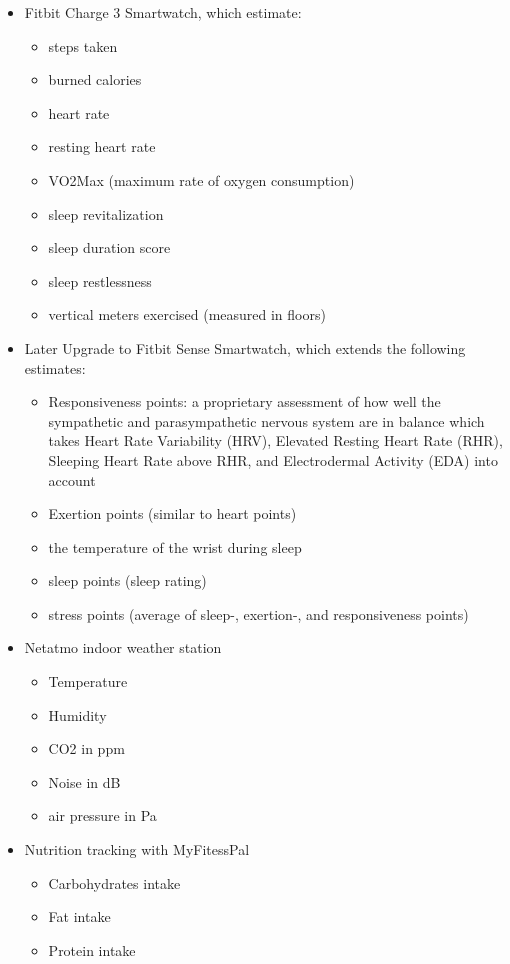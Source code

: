 \documentclass[conference]{IEEEtran}
\begin{document}
\begin{itemize}
\begin{itemize}
\end{itemize}
\item Fitbit Charge 3 Smartwatch, which estimate:
   \begin{itemize}
\item steps taken
\item burned calories
\item heart rate
\item resting heart rate
\item VO2Max (maximum rate of oxygen consumption)
\item sleep revitalization
\item sleep duration score
\item sleep restlessness
\item vertical meters exercised (measured in floors)
\end{itemize}
\item Later Upgrade to Fitbit Sense Smartwatch, which extends the following estimates:
   \begin{itemize}
\item Responsiveness points: a proprietary assessment of how well the sympathetic and parasympathetic nervous system are in balance which takes Heart Rate Variability (HRV), Elevated Resting Heart Rate (RHR), Sleeping Heart Rate above RHR, and Electrodermal Activity (EDA) into account
\item Exertion points (similar to heart points)
\item the temperature of the wrist during sleep
\item sleep points (sleep rating)
\item stress points (average of sleep-, exertion-, and responsiveness points)
\end{itemize}
\item Netatmo indoor weather station
   \begin{itemize}
\item Temperature
\item Humidity
\item CO2 in ppm
\item Noise in dB
\item air pressure in Pa
\end{itemize}
\item Nutrition tracking with MyFitessPal
   \begin{itemize}
\item Carbohydrates intake
\item Fat intake
\item Protein intake

\end{itemize}
\end{itemize}
\end{document}
